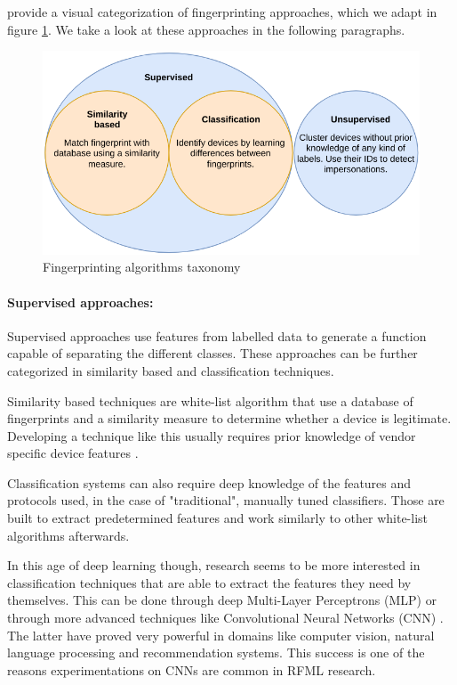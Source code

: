 \textcite{riyaz_deep_2018} provide a visual categorization of fingerprinting approaches, which we adapt in figure \ref{fig:algo-taxo}. We take a look at these approaches in the following paragraphs.

\begin{figure}[htp!]
  \centering
  \includegraphics[scale=0.5]{figures/sota_algo-taxonomy.png}
  \caption{Fingerprinting algorithms taxonomy}
  \label{fig:algo-taxo}
\end{figure}

\paragraph{Supervised approaches:} Supervised approaches use features from labelled data to generate a function capable of separating the different classes. These approaches can be further categorized in similarity based and classification techniques.

Similarity based techniques are white-list algorithm that use a database of fingerprints and a similarity measure to determine whether a device is legitimate. Developing a technique like this usually requires prior knowledge of vendor specific device features \cite{riyaz_deep_2018}.

Classification systems can also require deep knowledge of the features and protocols used, in the case of "traditional", manually tuned classifiers. Those are built to extract predetermined features and work similarly to other white-list algorithms afterwards.

In this age of deep learning though, research seems to be more interested in classification techniques that are able to extract the features they need by themselves. This can be done through deep Multi-Layer Perceptrons (MLP) \cite{delgado_passive_2020, stankowicz_complex_2019} or through more advanced techniques like Convolutional Neural Networks (CNN) \cite{riyaz_deep_2018, oyedare_estimating_2019, youssef_machine_2017, morin_transmitter_2019, sankhe_no_2019}. The latter have proved very powerful in domains like computer vision, natural language processing and recommendation systems. This success is one of the reasons experimentations on CNNs are common in RFML research.

